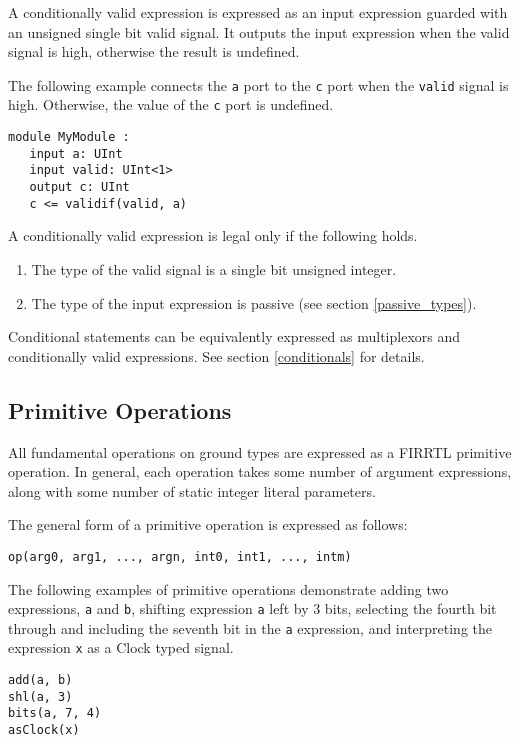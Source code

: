 \documentclass[12pt]{article}
\begin{document}
A conditionally valid expression is expressed as an input expression guarded with an unsigned single bit valid signal. It outputs the input expression when the valid signal is high, otherwise the result is undefined.

The following example connects the \verb|a| port to the \verb|c| port when the \verb|valid| signal is high. Otherwise, the value of the \verb|c| port is undefined.
\begin{lstlisting}
module MyModule :
   input a: UInt
   input valid: UInt<1>   
   output c: UInt
   c <= validif(valid, a)
\end{lstlisting}

A conditionally valid expression is legal only if the following holds.
\begin{enumerate}
\item The type of the valid signal is a single bit unsigned integer.
\item The type of the input expression is passive (see section \ref{passive_types}).
\end{enumerate}

Conditional statements can be equivalently expressed as multiplexors and conditionally valid expressions. See section \ref{conditionals} for details.

\subsection{Primitive Operations}

All fundamental operations on ground types are expressed as a FIRRTL primitive operation. In general, each operation takes some number of argument expressions, along with some number of static integer literal parameters. 

The general form of a primitive operation is expressed as follows:
\begin{lstlisting}
op(arg0, arg1, ..., argn, int0, int1, ..., intm)
\end{lstlisting}

The following examples of primitive operations demonstrate adding two expressions, \verb|a| and \verb|b|, shifting expression \verb|a| left by 3 bits, selecting the fourth bit through and including the seventh bit in the \verb|a| expression, and interpreting the expression \verb|x| as a Clock typed signal.
\begin{lstlisting}
add(a, b)
shl(a, 3)
bits(a, 7, 4)
asClock(x)
\end{lstlisting}
\end{document}
